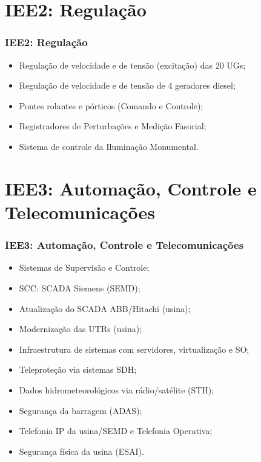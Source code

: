 \documentclass{beamer}
\begin{document}
\section[IEE2]{IEE2: Regulação}
\begin{frame}
\frametitle{IEE2: Regulação}
\begin{itemize}
    \item Regulação de velocidade e de tensão (excitação) das 20 UGs;
    \item Regulação de velocidade e de tensão de 4 geradores diesel;
    \item Pontes rolantes e pórticos (Comando e Controle);
    \item Registradores de Perturbações e Medição Fasorial;
    \item Sistema de controle da Iluminação Monumental.
\end{itemize}
\end{frame}

\section[IEE3]{IEE3: Automação, Controle e Telecomunicações}
\begin{frame}
\frametitle{IEE3: Automação, Controle e Telecomunicações}
\begin{itemize}
    \item Sistemas de Supervisão e Controle;
    \item SCC: SCADA Siemens (SEMD);
    \item Atualização do SCADA ABB/Hitachi (usina);
    \item Modernização das UTRs (usina);
    \item Infraestrutura de sistemas com servidores, virtualização e SO;
    \item Teleproteção via sistemas SDH;
    \item Dados hidrometeorológicos via rádio/satélite (STH);
    \item Segurança da barragem (ADAS);
    \item Telefonia IP da usina/SEMD e  Telefonia Operativa;
    \item Segurança física da usina (ESAI).
\end{itemize}
\end{frame}
\end{document}
